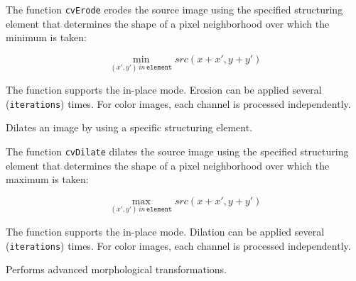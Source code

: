 \begin{description}
\end{description}

The function \texttt{cvErode} erodes the source image using the specified structuring element that determines the shape of a pixel neighborhood over which the minimum is taken:

\[
\min_{(x',y') \, in \, \texttt{element}}src(x+x',y+y')
\]

The function supports the in-place mode. Erosion can be applied several (\texttt{iterations}) times. For color images, each channel is processed independently.

\label{Dilate}

Dilates an image by using a specific structuring element.


\begin{description}
\end{description}

The function \texttt{cvDilate} dilates the source image using the specified structuring element that determines the shape of a pixel neighborhood over which the maximum is taken:

\[
\max_{(x',y') \, in \, \texttt{element}}src(x+x',y+y')
\]

The function supports the in-place mode. Dilation can be applied several (\texttt{iterations}) times. For color images, each channel is processed independently.

\label{MorphologyEx}

Performs advanced morphological transformations.



